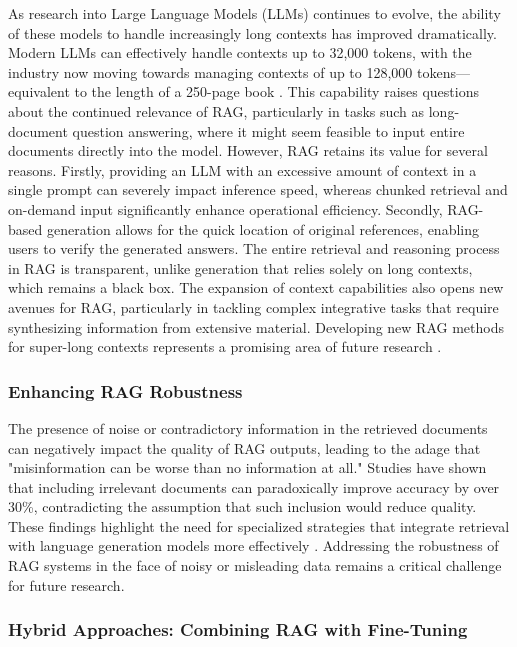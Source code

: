 As research into Large Language Models (LLMs) continues to evolve, the ability of these models to handle increasingly long contexts has improved dramatically. Modern LLMs can effectively handle contexts up to 32,000 tokens, with the industry now moving towards managing contexts of up to 128,000 tokens—equivalent to the length of a 250-page book \cite{ibm2023}. This capability raises questions about the continued relevance of RAG, particularly in tasks such as long-document question answering, where it might seem feasible to input entire documents directly into the model. However, RAG retains its value for several reasons. Firstly, providing an LLM with an excessive amount of context in a single prompt can severely impact inference speed, whereas chunked retrieval and on-demand input significantly enhance operational efficiency. Secondly, RAG-based generation allows for the quick location of original references, enabling users to verify the generated answers. The entire retrieval and reasoning process in RAG is transparent, unlike generation that relies solely on long contexts, which remains a black box. The expansion of context capabilities also opens new avenues for RAG, particularly in tackling complex integrative tasks that require synthesizing information from extensive material. Developing new RAG methods for super-long contexts represents a promising area of future research \cite{gao2023retrieval}.

\subsubsection{Enhancing RAG Robustness}

The presence of noise or contradictory information in the retrieved documents can negatively impact the quality of RAG outputs, leading to the adage that "misinformation can be worse than no information at all." Studies have shown that including irrelevant documents can paradoxically improve accuracy by over 30\%, contradicting the assumption that such inclusion would reduce quality. These findings highlight the need for specialized strategies that integrate retrieval with language generation models more effectively \cite{cuconasu2024power}. Addressing the robustness of RAG systems in the face of noisy or misleading data remains a critical challenge for future research.

\subsubsection{Hybrid Approaches: Combining RAG with Fine-Tuning}

